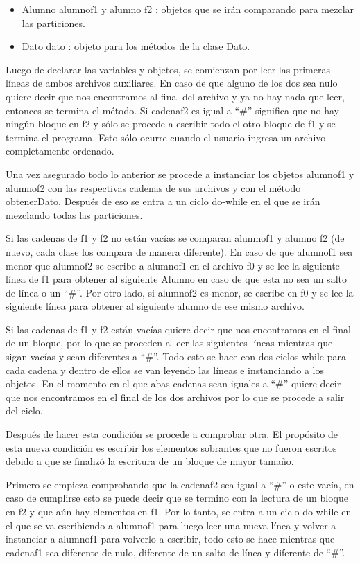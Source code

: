 \documentclass[11pt]{article}
\begin{document}
\begin{itemize}
\begin{itemize}
\item Alumno alumnof1 y alumno f2 : objetos que se irán comparando para mezclar las particiones.
\item Dato dato : objeto para los métodos de la clase Dato.
\end{itemize}
Luego de declarar las variables y objetos, se comienzan por leer las primeras líneas de ambos archivos auxiliares. En caso de que alguno de los dos sea nulo quiere decir que nos encontramos al final del archivo y ya no hay nada que leer, entonces se termina el método. Si cadenaf2 es igual a “\#” significa que no hay ningún bloque en f2 y sólo se procede a escribir todo el otro bloque de f1 y se termina el programa. Esto sólo ocurre cuando el usuario ingresa un archivo completamente ordenado.
\par 
Una vez asegurado todo lo anterior se procede a instanciar los objetos alumnof1 y alumnof2 con las respectivas cadenas de sus archivos y con el método obtenerDato. Después de eso se entra a un ciclo do-while en el que se irán mezclando todas las particiones.
\par 
Si las cadenas de f1 y f2 no están vacías se comparan alumnof1 y alumno f2 (de nuevo, cada clase los compara de manera diferente). En caso de que alumnof1 sea menor que alumnof2 se escribe a alumnof1 en el archivo f0 y se lee la siguiente línea de f1 para obtener al siguiente Alumno en caso de que esta no sea un salto de línea o un “\#”. Por otro lado, si alumnof2 es menor, se escribe en f0 y se lee la siguiente línea para obtener al siguiente alumno de ese mismo archivo.
\par 
Si las cadenas de f1 y f2 están vacías quiere decir que nos encontramos en el final de un bloque, por lo que se proceden a leer las siguientes líneas mientras que sigan vacías y sean diferentes a “\#”. Todo esto se hace con dos ciclos while para cada cadena y dentro de ellos se van leyendo las líneas e instanciando a los objetos. En el momento en el que abas cadenas sean iguales a “\#” quiere decir que nos encontramos en el final de los dos archivos por lo que se procede a salir del ciclo.
\par 
Después de hacer esta condición se procede a comprobar otra. El propósito de esta nueva condición es escribir los elementos sobrantes que no fueron escritos debido a que se finalizó la escritura de un bloque de mayor tamaño. 
\par 
Primero se empieza comprobando que la cadenaf2 sea igual a “\#” o este vacía, en caso de cumplirse esto se puede decir que se termino con la lectura de un bloque en f2 y que aún hay elementos en f1. Por lo tanto, se entra a un ciclo do-while en el que se va escribiendo a alumnof1 para luego leer una nueva línea y volver a instanciar a alumnof1 para volverlo a escribir, todo esto se hace mientras que cadenaf1 sea diferente de nulo, diferente de un salto de línea y diferente de “\#”. 

\end{itemize}
\end{document}
